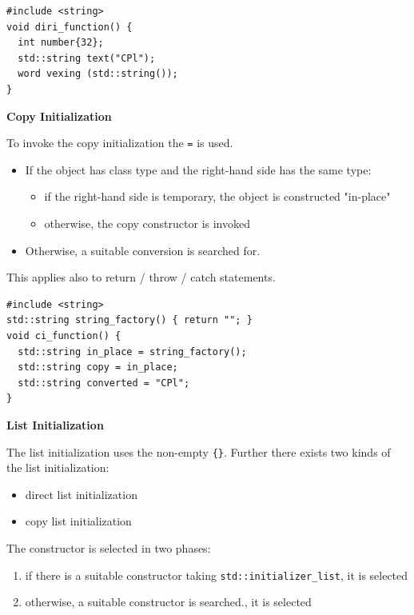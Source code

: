 \documentclass[11pt,twoside,landscape]{article}
\begin{document}
\begin{multicols}{3}
\lstset{language=c++,label= ,caption= ,captionpos=b,numbers=none}
\begin{lstlisting}
#include <string>
void diri_function() {
  int number{32};
  std::string text("CPl");
  word vexing (std::string()); 
}
\end{lstlisting}

\textbf{Copy Initialization}

To invoke the copy initialization the \texttt{=} is used.

\begin{itemize}
\item If the object has class type and the right-hand side has the same type:
\begin{itemize}
\item if the right-hand side is temporary, the object is constructed "in-place"
\item otherwise, the copy constructor is invoked
\end{itemize}
\item Otherwise, a suitable conversion is searched for.
\end{itemize}

This applies also to return / throw / catch statements.

\lstset{language=c++,label= ,caption= ,captionpos=b,numbers=none}
\begin{lstlisting}
#include <string>
std::string string_factory() { return ""; }
void ci_function() {
  std::string in_place = string_factory();
  std::string copy = in_place;
  std::string converted = "CPl";
}
\end{lstlisting}

\textbf{List Initialization}

The list initialization uses the non-empty \texttt{\{\}}.
Further there exists two kinds of the list initialization:
\begin{itemize}
\item direct list initialization
\item copy list initialization
\end{itemize}


The constructor is selected in two phases:
\begin{enumerate}
\item if there is a suitable constructor taking \texttt{std::initializer\_list}, it is selected
\item otherwise, a suitable constructor is searched., it is selected
\end{enumerate}



\end{multicols}
\end{document}
